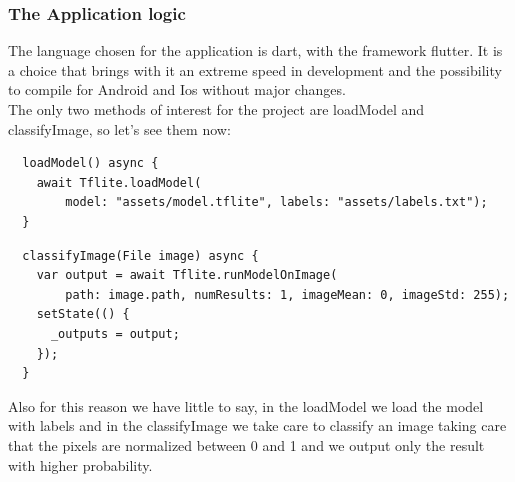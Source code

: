 \subsubsection{The Application logic}
The language chosen for the application is dart, with the framework flutter. It is a choice that brings with it an extreme speed in development and the possibility to compile for Android and Ios without major changes.\\
The only two methods of interest for the project are loadModel and classifyImage, so let's see them now:
\lstset{frame=lines}
\lstset{basicstyle=\footnotesize}
\begin{lstlisting}
  loadModel() async {
    await Tflite.loadModel(
        model: "assets/model.tflite", labels: "assets/labels.txt");
  }
\end{lstlisting}

\lstset{frame=lines}
\lstset{basicstyle=\footnotesize}
\begin{lstlisting}
  classifyImage(File image) async {
    var output = await Tflite.runModelOnImage(
        path: image.path, numResults: 1, imageMean: 0, imageStd: 255);
    setState(() {
      _outputs = output;
    });
  }
\end{lstlisting}

Also for this reason we have little to say, in the loadModel we load the model with labels and in the classifyImage we take care to classify an image taking care that the pixels are normalized between 0 and 1 and we output only the result with higher probability.

